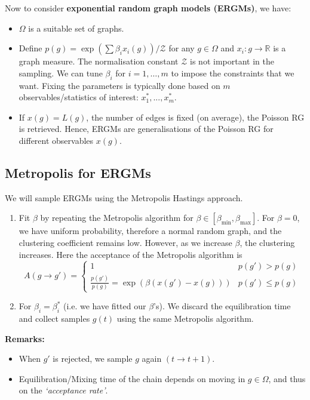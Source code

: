 \documentclass[12pt]{article}
\theoremstyle{definition}
\begin{document}
Now to consider \textbf{exponential random graph models (ERGMs)}, we have: 
\begin{itemize}
    \item $\Omega$ is a suitable set of graphs.
    \item Define $p(g)=\exp(\sum \beta_i x_i(g))/\mathcal Z$ for any $g\in \Omega$ and $x_i\colon g\to \mathbb R$ is a graph measure. The normalisation constant $\mathcal Z$ is not important in the sampling. We can tune $\beta_i$ for $i=1,\dots, m$ to impose the constraints that we want. Fixing the parameters is typically done based on $m$ observables/statistics of interest: $x_1^*,...,x_m^*$. 
    \item If $x(g) = L(g)$, the number of edges is fixed (on average), the Poisson RG is retrieved. Hence, ERGMs are generalisations of the Poisson RG for different observables $x(g)$. 
\end{itemize}

\subsection{Metropolis for ERGMs}

We will sample ERGMs using the Metropolis Hastings approach.

\begin{enumerate}
    \item Fit $\beta$ by repeating the Metropolis algorithm for $\beta\in[\beta_{\min}, \beta_{\max}]$. For $\beta=0$, we have uniform probability, therefore a normal random graph, and the clustering coefficient remains low. However, as we increase $\beta$, the clustering increases. Here the acceptance of the Metropolis algorithm is
    \[
        A(g\to g') = 
        \begin{cases}
            1 & {p(g')>p(g)} \\
            \frac{p(g')}{p(g)}  = \exp{(\beta(x(g')-x(g)))} & p(g')\leq p(g)
        \end{cases}
    \]
    \item For $\beta_i = \beta_i^*$ (i.e. we have fitted our $\beta$'s). We discard the equilibration time and collect samples $g(t)$ using the same Metropolis algorithm. 
\end{enumerate}

\textbf{Remarks: }
\begin{itemize}
    \item When $g'$ is rejected, we sample $g$ again $(t\to t+1)$. 
    \item Equilibration/Mixing time of the chain depends on moving in $g\in\Omega$, and thus on the \textit{`acceptance rate'}. 
\end{itemize}
\end{document}

